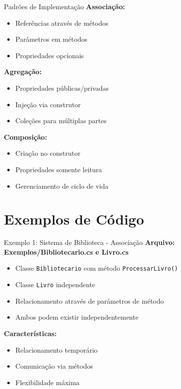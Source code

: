 \documentclass[aspectratio=169]{beamer}
\begin{document}
\begin{frame}{Padrões de Implementação}
\textbf{Associação:}
\begin{itemize}
\item Referências através de métodos
\item Parâmetros em métodos
\item Propriedades opcionais
\end{itemize}

\textbf{Agregação:}
\begin{itemize}
\item Propriedades públicas/privadas
\item Injeção via construtor
\item Coleções para múltiplas partes
\end{itemize}

\textbf{Composição:}
\begin{itemize}
\item Criação no construtor
\item Propriedades somente leitura
\item Gerenciamento de ciclo de vida
\end{itemize}
\end{frame}

\section{Exemplos de Código}

\begin{frame}{Exemplo 1: Sistema de Biblioteca - Associação}
\textbf{Arquivo: Exemplos/Bibliotecario.cs e Livro.cs}
\begin{itemize}
\item Classe \texttt{Bibliotecario} com método \texttt{ProcessarLivro()}
\item Classe \texttt{Livro} independente
\item Relacionamento através de parâmetros de método
\item Ambos podem existir independentemente
\end{itemize}

\vspace{0.3cm}
\textbf{Características:}
\begin{itemize}
\item Relacionamento temporário
\item Comunicação via métodos
\item Flexibilidade máxima
\end{itemize}
\end{frame}
\end{document}
